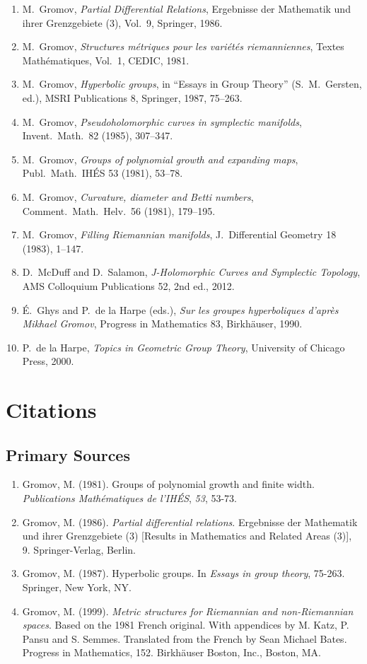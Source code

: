 \begin{enumerate}
    \item M.\ Gromov, \textit{Partial Differential Relations}, Ergebnisse der Mathematik und ihrer Grenzgebiete (3), Vol.\ 9, Springer, 1986.
    \item M.\ Gromov, \textit{Structures m\'etriques pour les vari\'et\'es riemanniennes}, Textes Math\'ematiques, Vol.\ 1, CEDIC, 1981.
    \item M.\ Gromov, \textit{Hyperbolic groups}, in ``Essays in Group Theory'' (S.\ M.\ Gersten, ed.), MSRI Publications 8, Springer, 1987, 75--263.
    \item M.\ Gromov, \textit{Pseudoholomorphic curves in symplectic manifolds}, Invent.\ Math.\ 82 (1985), 307--347.
    \item M.\ Gromov, \textit{Groups of polynomial growth and expanding maps}, Publ.\ Math.\ IH\'ES 53 (1981), 53--78.
    \item M.\ Gromov, \textit{Curvature, diameter and Betti numbers}, Comment.\ Math.\ Helv.\ 56 (1981), 179--195.
    \item M.\ Gromov, \textit{Filling Riemannian manifolds}, J.\ Differential Geometry 18 (1983), 1--147.
    \item D.\ McDuff and D.\ Salamon, \textit{J-Holomorphic Curves and Symplectic Topology}, AMS Colloquium Publications 52, 2nd ed., 2012.
    \item \'E.\ Ghys and P.\ de la Harpe (eds.), \textit{Sur les groupes hyperboliques d'apr\`es Mikhael Gromov}, Progress in Mathematics 83, Birkh\"auser, 1990.
    \item P.\ de la Harpe, \textit{Topics in Geometric Group Theory}, University of Chicago Press, 2000.
\end{enumerate}

\section{Citations}

\subsection*{Primary Sources}
\begin{enumerate}
    \item Gromov, M. (1981). Groups of polynomial growth and finite width. \textit{Publications Mathématiques de l'IHÉS}, \textit{53}, 53-73.
    \item Gromov, M. (1986). \textit{Partial differential relations}. Ergebnisse der Mathematik und ihrer Grenzgebiete (3) [Results in Mathematics and Related Areas (3)], 9. Springer-Verlag, Berlin.
    \item Gromov, M. (1987). Hyperbolic groups. In \textit{Essays in group theory}, 75-263. Springer, New York, NY.
    \item Gromov, M. (1999). \textit{Metric structures for Riemannian and non-Riemannian spaces}. Based on the 1981 French original. With appendices by M. Katz, P. Pansu and S. Semmes. Translated from the French by Sean Michael Bates. Progress in Mathematics, 152. Birkhäuser Boston, Inc., Boston, MA.
\end{enumerate}

